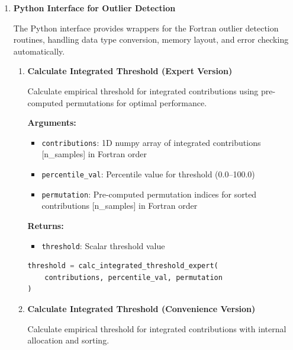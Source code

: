 \documentclass[11pt]{article}
\begin{document}
\begin{enumerate}
	\item \textbf{Python Interface for Outlier Detection}
	      
	      The Python interface provides wrappers for the Fortran outlier detection routines,
	      handling data type conversion, memory layout, and error checking
	      automatically.
	      
	      \begin{enumerate}
	      	\item \textbf{Calculate Integrated Threshold (Expert Version)}
	      	      
	      	      Calculate empirical threshold for integrated contributions using pre-computed
	      	      permutations for optimal performance.
	      	      
	      	      \textbf{Arguments:}
	      	      \begin{itemize}
	      	      	\item \texttt{contributions}: 1D numpy array of integrated contributions
	      	      	      [n\_samples] in Fortran order
	      	      	      
	      	      	\item \texttt{percentile\_val}: Percentile value for threshold (0.0--100.0)
	      	      	      
	      	      	\item \texttt{permutation}: Pre-computed permutation indices for sorted
	      	      	      contributions [n\_samples] in Fortran order
	      	      \end{itemize}
	      	      \textbf{Returns:}
	      	      \begin{itemize}
	      	      	\item \texttt{threshold}: Scalar threshold value
	      	      \end{itemize}
	      	      \begin{lstlisting}[language=Python, caption={Integrated Threshold Calculation (Expert)}]
threshold = calc_integrated_threshold_expert(
    contributions, percentile_val, permutation
)
	      	      \end{lstlisting}
	      	      
	      	\item \textbf{Calculate Integrated Threshold (Convenience Version)}
	      	      
	      	      Calculate empirical threshold for integrated contributions with internal
	      	      allocation and sorting.
	      	      

\end{enumerate}
\end{enumerate}
\end{document}
